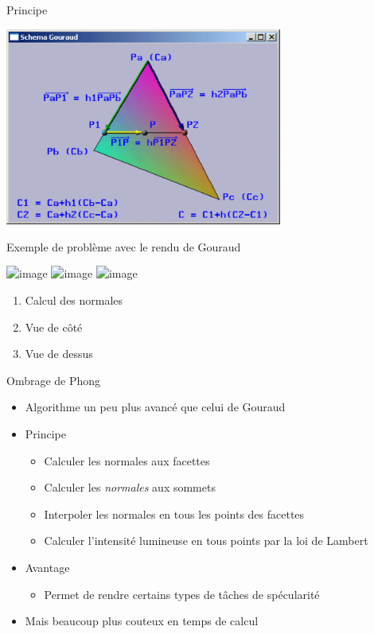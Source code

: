 \begin{frame}[t]{Principe}
  \begin{center}
    \includegraphics[height=6.5cm]{figs/gouraud1.png}
  \end{center}
\end{frame}

\begin{frame}[t]{Exemple de problème avec le rendu de Gouraud}
  \begin{center}
    \includegraphics<1>[height=4.5cm]{figs/gouraud2.png}
    \includegraphics<2>[height=4.5cm]{figs/gouraud3.png}
    \includegraphics<3>[height=4.5cm]{figs/gouraud4.png}
  \end{center}
  \begin{enumerate}
    \item<1> Calcul des normales
    \item<2> Vue de côté
    \item<3> Vue de dessus
  \end{enumerate}
\end{frame}

\begin{frame}[t]{Ombrage de Phong}
  \begin{itemize}
    \item Algorithme un peu plus avancé que celui de Gouraud
    \item Principe
    \begin{itemize}
      \item Calculer les normales aux facettes
      \item Calculer les \emph{normales} aux sommets
      \item Interpoler les normales en tous les points des facettes
      \item Calculer l'intensité lumineuse en tous points par la loi de Lambert
    \end{itemize}
    \item Avantage
    \begin{itemize}
      \item Permet de rendre certains types de tâches de spécularité
    \end{itemize}
    \item Mais beaucoup plus couteux en temps de calcul
  \end{itemize}
\end{frame}

